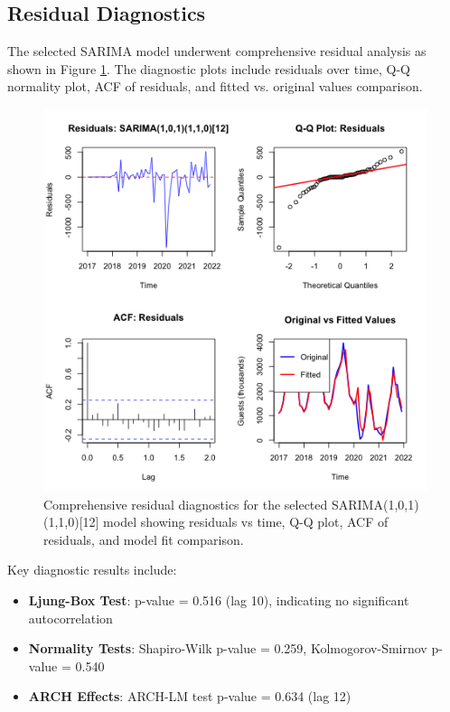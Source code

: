 \documentclass[journal]{IEEEtran}
\begin{document}
\subsection{Residual Diagnostics}

The selected SARIMA model underwent comprehensive residual analysis as shown in Figure \ref{fig:residuals}. The diagnostic plots include residuals over time, Q-Q normality plot, ACF of residuals, and fitted vs. original values comparison.

\begin{figure}[h]
    \centering
    \includegraphics[width=1\linewidth]{plots/residuals.png}
    \caption{Comprehensive residual diagnostics for the selected SARIMA(1,0,1)(1,1,0)[12] model showing residuals vs time, Q-Q plot, ACF of residuals, and model fit comparison.}
    \label{fig:residuals}
\end{figure}

Key diagnostic results include:
\begin{itemize}
    \item \textbf{Ljung-Box Test}: p-value = 0.516 (lag 10), indicating no significant autocorrelation
    \item \textbf{Normality Tests}: Shapiro-Wilk p-value = 0.259, Kolmogorov-Smirnov p-value = 0.540
    \item \textbf{ARCH Effects}: ARCH-LM test p-value = 0.634 (lag 12)
\end{itemize}
\end{document}
